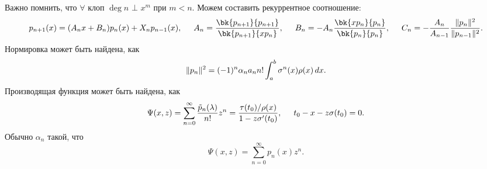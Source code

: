 Важно помнить, что $\forall$ клоп $\deg n$ $\bot$ $x^m$ при $m < n$. Можем составить рекуррентное соотношение:
\begin{equation*}
    p_{n+1} (x) = (A_n x + B_n) p_n (x) + X_n p_{n-1} (x),
    \hspace{5 mm} 
    A_n = \frac{
        \bk{p_{n+1}}{p_{n+1}}
    }{
        \bk{p_{n+1}}{x p_n}
    },
    \hspace{5 mm} 
    B_n = -A_n \frac{\bk{x p_n}{p_n}}{\bk{p_n}{p_n}},
    \hspace{5 mm} 
    C_n = - \frac{A_n}{A_{n-1}} \frac{\|p_n\|^2}{\|p_{n-1}\|^2}.
\end{equation*}
Нормировка может быть найдена, как
\begin{equation*}
    \|p_n\|^2 = (-1)^n \alpha_n a_n n! \int_{a}^{b} \sigma^n (x) \rho(x) \, d x.
\end{equation*}
Производящая функция может быть найдена, как
\begin{equation*}
    \Psi(x, z) = \sum_{n=0}^{\infty}  \frac{\tilde{p}_n (\lambda)}{n!} z^n = 
    \frac{\tau(t_0)/ \rho(x)}{1 - z \sigma' (t_0)},
    \hspace{5 mm} 
    t_0 - x -  z \sigma(t_0) = 0.
\end{equation*}
Обычно $\alpha_n$ такой, что
\begin{equation*}
    \Psi(x, z) = \sum_{n=0}^{\infty} p_n (x) z^n.
\end{equation*}


